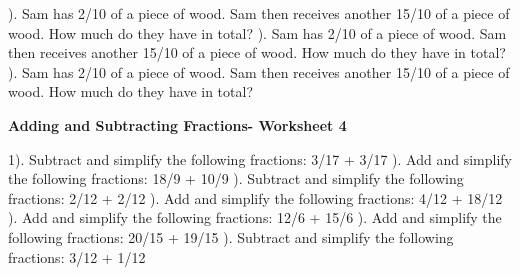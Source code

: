 \documentclass{article}%
\begin{document}
\newline%
\newline%
). Sam has 2/10 of a piece of wood. Sam then receives another 15/10 of a piece of wood. How much do they have in total?%
\newline%
\newline%
). Sam has 2/10 of a piece of wood. Sam then receives another 15/10 of a piece of wood. How much do they have in total?%
\newline%
\newline%
). Sam has 2/10 of a piece of wood. Sam then receives another 15/10 of a piece of wood. How much do they have in total?%
\newline%
\newline%
\newline%
\pagebreak%
\large%
\begin{center}%
\textbf{Adding and Subtracting Fractions- Worksheet 4}%
\newline%
\end{center} \normalsize%
1). Subtract and simplify the following fractions: 3/17 + 3/17%
\newline%
\newline%
). Add and simplify the following fractions: 18/9 + 10/9%
\newline%
\newline%
). Subtract and simplify the following fractions: 2/12 + 2/12%
\newline%
\newline%
). Add and simplify the following fractions: 4/12 + 18/12%
\newline%
\newline%
). Add and simplify the following fractions: 12/6 + 15/6%
\newline%
\newline%
). Add and simplify the following fractions: 20/15 + 19/15%
\newline%
\newline%
). Subtract and simplify the following fractions: 3/12 + 1/12%
\newline%
\newline%
\end{document}
